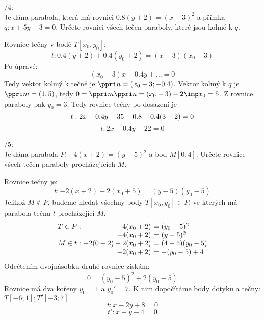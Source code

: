/4:\\
Je dána parabola, která má rovnici $0.8(y+2) = (x-3)^2$ a přímka $q:x+5y - 3 = 0$.
Určete rovnici všech tečen paraboly, které jsou kolmé k $q$.

Rovnice tečny v bodě $T[x_0,y_0]$:
$$t: 0.4(y+2) + 0.4(y_0 + 2)  = (x-3)(x_0-3)$$
Po úpravé:
$$ (x_0-3) x - 0.4 y + \dots =0 $$
Tedy vektor kolmý k tečně je $\ve n = (x_0-3;-0.4)$.
Vektor kolmý k $q$ je $\ve m = (1,5)$, tedy $0 = \ve m \* \ve n = (x_0-3) - 2 \imp x_0 = 5$.
Z rovnice paraboly pak $y_0 = 3$.
Tedy rovnice tečny po dosazení je
$$ t: 2x - 0.4 y - 3\* 5 - 0.8 - 0.4 (3+2) = 0$$
$$ t: 2x - 0.4 y - 22 = 0$$

/5:\\
Je dána parabola $P:-4(x+2) = (y-5)^2$ a bod $M[0;4]$.
Určete rovnice všech tečen paraboly procházejících $M$.

Rovnice tečny je:
$$t:-2(x+2) - 2 (x_0+5) = (y-5)(y_0-5)$$
Jelikož $M \not\in P$, budeme hledat všechny body $T[x_0,y_0] \in P$, ve kterých má parabola tečnu $t$ procházející $M$.
$$
\begin{array}{r@{\ }r@{\ =\ }l}
	T\in P :& -4 (x_0+2) & (y_0-5)^2 \\
	& -4 (x_0+2) & (y-5)^2 \\
	M\in t :& -2 ( 0 + 2) - 2 (x_0 + 2 ) & (4-5)(y_0 - 5)\\
	& - 2 (x_0 + 2 ) & -(y_0 - 5) + 4\\
\end{array}
$$
Odečtením dvojnásobku druhé rovnice získám:
$$ 0 = (y_0 - 5 )^ 2 + 2(y_0-5) $$
Rovnice má dva kořeny $y_0 = 1$ a $y_0'=7$.
K nim dopočítáme body dotyku a tečny:
$ T[-6;1]; T'[-3;7]$
$$ t: x-2y+8=0$$
$$ t': x+y-4 = 0$$

